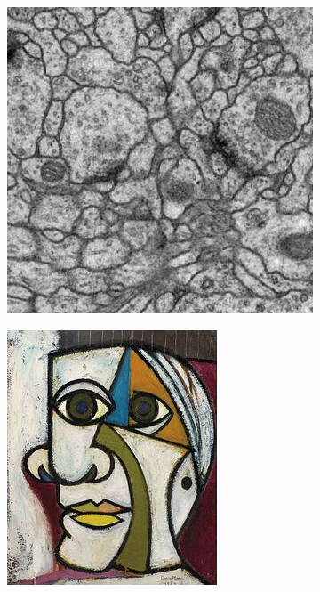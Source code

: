 \documentclass[12pt, a4paper]{scrartcl}
\begin{document}
\begin{figure}[H]
\centering
\begin{subfigure}{.34\textwidth}
  \centering
  \includegraphics[width=.9\linewidth]{ISBI0}

  \label{fig:nas31}
\end{subfigure}%
\begin{subfigure}{.28\textwidth}
  \centering
  \includegraphics[width=.9\linewidth]{style3}


\end{subfigure}
\end{figure}
\end{document}
